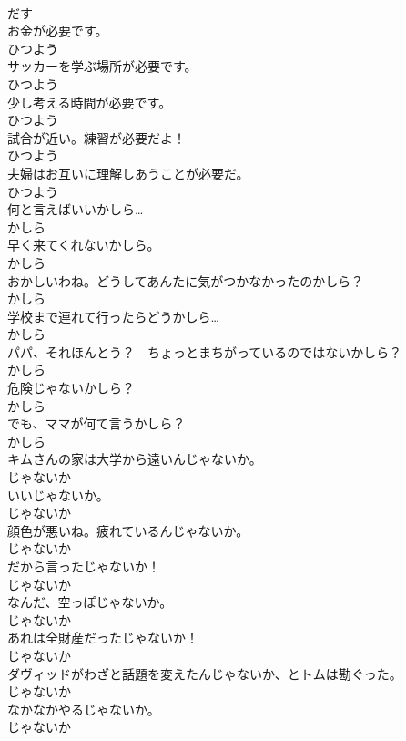 \documentclass[8pt]{extreport}
\begin{document}
\begin{CJK}{UTF8}{min}
\\	だす
\\	お金が必要です。	
\\	ひつよう
\\	サッカーを学ぶ場所が必要です。	
\\	ひつよう
\\	少し考える時間が必要です。	
\\	ひつよう
\\	試合が近い。練習が必要だよ！	
\\	ひつよう
\\	夫婦はお互いに理解しあうことが必要だ。	
\\	ひつよう
\\	何と言えばいいかしら…	
\\	かしら
\\	早く来てくれないかしら。	
\\	かしら
\\	おかしいわね。どうしてあんたに気がつかなかったのかしら？	
\\	かしら
\\	学校まで連れて行ったらどうかしら…	
\\	かしら
\\	パパ、それほんとう？　ちょっとまちがっているのではないかしら？	
\\	かしら
\\	危険じゃないかしら？	
\\	かしら
\\	でも、ママが何て言うかしら？	
\\	かしら
\\	キムさんの家は大学から遠いんじゃないか。	
\\	じゃないか
\\	いいじゃないか。	
\\	じゃないか
\\	顔色が悪いね。疲れているんじゃないか。	
\\	じゃないか
\\	だから言ったじゃないか！	
\\	じゃないか
\\	なんだ、空っぽじゃないか。	
\\	じゃないか
\\	あれは全財産だったじゃないか！	
\\	じゃないか
\\	ダヴィッドがわざと話題を変えたんじゃないか、とトムは勘ぐった。	
\\	じゃないか
\\	なかなかやるじゃないか。	
\\	じゃないか

\end{CJK}
\end{document}
